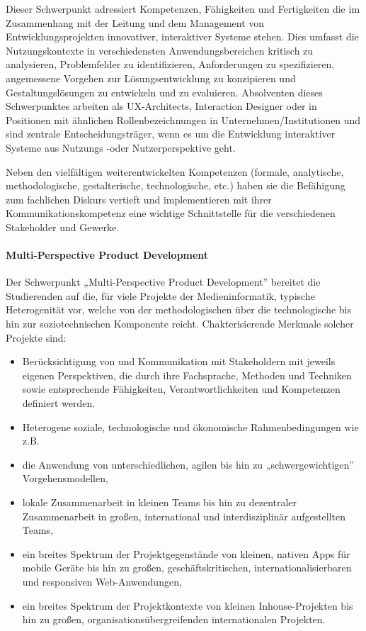 Dieser Schwerpunkt adressiert Kompetenzen, Fähigkeiten und Fertigkeiten
die im Zusammenhang mit der Leitung und dem Management von
Entwicklungsprojekten innovativer, interaktiver Systeme stehen. Dies
umfasst die Nutzungskontexte in verschiedensten Anwendungsbereichen
kritisch zu analysieren, Problemfelder zu identifizieren, Anforderungen
zu spezifizieren, angemessene Vorgehen zur Lösungsentwicklung zu
konzipieren und Gestaltungslösungen zu entwickeln und zu evaluieren.
Absolventen dieses Schwerpunktes arbeiten als UX-Architects, Interaction
Designer oder in Positionen mit ähnlichen Rollenbezeichnungen in
Unternehmen/Institutionen und sind zentrale Entscheidungsträger, wenn es
um die Entwicklung interaktiver Systeme aus Nutzungs -oder
Nutzerperspektive geht.

Neben den vielfältigen weiterentwickelten Kompetenzen (formale,
analytische, methodologische, gestalterische, technologische, etc.)
haben sie die Befähigung zum fachlichen Diskurs vertieft und
implementieren mit ihrer Kommunikationskompetenz eine wichtige
Schnittstelle für die verschiedenen Stakeholder und Gewerke.

\paragraph{Multi-Perspective Product
Development}\label{multi-perspective-product-development}

Der Schwerpunkt „Multi-Perspective Product Development'' bereitet die
Studierenden auf die, für viele Projekte der Medieninformatik, typische
Heterogenität vor, welche von der methodologischen über die
technologische bis hin zur soziotechnischen Komponente reicht.
Chakterisierende Merkmale solcher Projekte sind:

\begin{itemize}
\tightlist
\item
  Berücksichtigung von und Kommunikation mit Stakeholdern mit jeweils
  eigenen Perspektiven, die durch ihre Fachsprache, Methoden und
  Techniken sowie entsprechende Fähigkeiten, Verantwortlichkeiten und
  Kompetenzen definiert werden.
\item
  Heterogene soziale, technologische und ökonomische Rahmenbedingungen
  wie z.B.
\item
  die Anwendung von unterschiedlichen, agilen bis hin zu
  „schwergewichtigen'' Vorgehensmodellen,
\item
  lokale Zusammenarbeit in kleinen Teams bis hin zu dezentraler
  Zusammenarbeit in großen, international und interdisziplinär
  aufgestellten Teams,
\item
  ein breites Spektrum der Projektgegenstände von kleinen, nativen Apps
  für mobile Geräte bis hin zu großen, geschäftskritischen,
  internationalisierbaren und responsiven Web-Anwendungen,
\item
  ein breites Spektrum der Projektkontexte von kleinen Inhouse-Projekten
  bis hin zu großen, organisationsübergreifenden internationalen
  Projekten.
\end{itemize}

